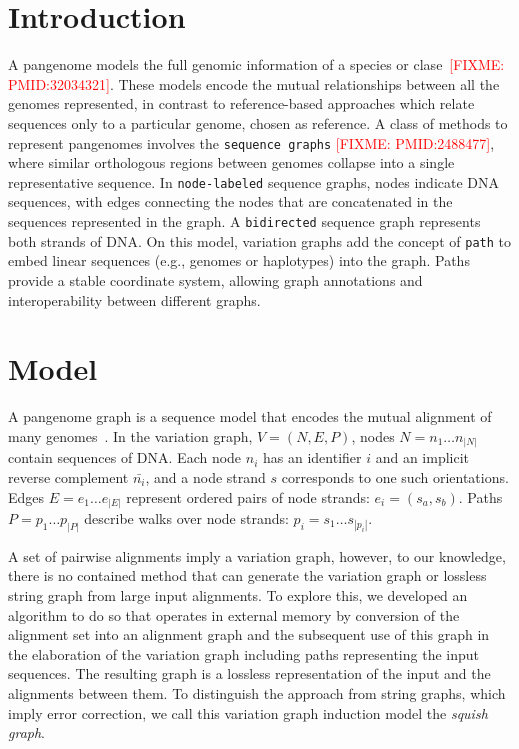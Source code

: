 \documentclass{bioinfo}
\newcommand{\red}[1]{{\textcolor{Red}{#1}}}
\newcommand{\FIXME}[1]{\red{[FIXME: #1]}}
\begin{document}
    \maketitle


    \section{Introduction}
    \label{sec:introduction}
    A pangenome models the full genomic information of a species or clase~\FIXME{PMID:32034321}.
    These models encode the mutual relationships between all the genomes represented, in contrast to reference-based approaches which relate sequences only to a particular genome, chosen as reference.
    A class of methods to represent pangenomes involves the \texttt{sequence graphs} \FIXME{PMID:2488477}, where similar orthologous regions between genomes collapse into a single representative sequence.
    In \texttt{node-labeled} sequence graphs, nodes indicate DNA sequences, with edges connecting the nodes that are concatenated in the sequences represented in the graph.
    A \texttt{bidirected} sequence graph represents both strands of DNA.
    On this model, variation graphs add the concept of \texttt{path} to embed linear sequences (e.g., genomes or haplotypes) into the graph\citep{Garrison:2018}.
    Paths provide a stable coordinate system, allowing graph annotations and interoperability between different graphs.


    \section{Model}
    \label{sec:model}
    A pangenome graph is a sequence model that encodes the mutual alignment of many genomes~\citep{Garrison_2019_thesis,Eizenga_2020}.
    In the variation graph, $V = (N, E, P)$, nodes $N = n_1\ldots n_{|N|}$ contain sequences of DNA.
    Each node $n_i$ has an identifier $i$ and an implicit reverse complement $\bar{n_i}$, and a node strand $s$ corresponds to one such orientations.
    Edges $E = e_1\ldots e_{|E|}$ represent ordered pairs of node strands: $e_i = ( s_a, s_b )$.
    Paths $P = p_1\ldots p_{|P|}$ describe walks over node strands: $p_i = s_1 \ldots s_{|p_i|}$.

    A set of pairwise alignments imply a variation graph, however, to our knowledge, there is no contained method that can
    generate the variation graph or lossless string graph from large input alignments.
    To explore this, we developed an algorithm to do so that operates in external memory by conversion of the alignment
    set into an alignment graph and the subsequent use of this graph in the elaboration of the variation graph including paths representing the input sequences.
    The resulting graph is a lossless representation of the input and the alignments between them.
    To distinguish the approach from string graphs, which imply error correction, we call this variation graph induction model the \emph{squish graph}.
\end{document}
